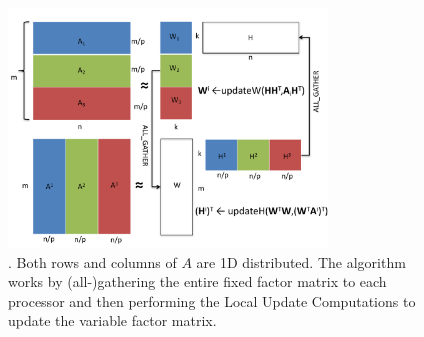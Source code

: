 \begin{figure}[t!]
\centering
\includegraphics[height=2.5in, width=\columnwidth]{fig/anlsbpp.pdf}
\caption{\NaiveAlg. Both rows and columns of $A$ are 1D distributed.  The algorithm works by (all-)gathering the entire fixed factor matrix to each processor and then performing the Local Update Computations to update the variable factor matrix.} 
\label{fig:naive}
\end{figure}

\renewcommand{\arraystretch}{1.25}
\newcommand{\smallerfont}{\scriptsize}

